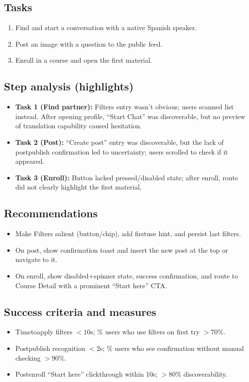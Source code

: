\documentclass[11pt,a4paper]{article}
\begin{document}
\subsection{Tasks}
\begin{enumerate}[leftmargin=*]
  \item Find and start a conversation with a native Spanish speaker.
  \item Post an image with a question to the public feed.
  \item Enroll in a course and open the first material.
\end{enumerate}

\subsection{Step analysis (highlights)}
\begin{itemize}[leftmargin=*]
  \item \textbf{Task 1 (Find partner):} Filters entry wasn’t obvious; users scanned list instead. After opening profile, ``Start Chat'' was discoverable, but no preview of translation capability caused hesitation.
  \item \textbf{Task 2 (Post):} ``Create post'' entry was discoverable, but the lack of post\-publish confirmation led to uncertainty; users scrolled to check if it appeared.
  \item \textbf{Task 3 (Enroll):} Button lacked pressed/disabled state; after enroll, route did not clearly highlight the first material.
\end{itemize}

\subsection{Recommendations}
\begin{itemize}[leftmargin=*]
  \item Make Filters salient (button/chip), add first\-use hint, and persist last filters.
  \item On post, show confirmation toast and insert the new post at the top or navigate to it.
  \item On enroll, show disabled+spinner state, success confirmation, and route to Course Detail with a prominent ``Start here'' CTA.
\end{itemize}

\subsection{Success criteria and measures}
\begin{itemize}[leftmargin=*]
  \item Time\-to\-apply filters $< 10$s; \% users who use filters on first try $> 70\%$.
  \item Post\-publish recognition $< 2$s; \% users who see confirmation without manual checking $> 90\%$.
  \item Post\-enroll ``Start here'' click\-through within 10s; $> 80\%$ discoverability.
\end{itemize}
\end{document}
